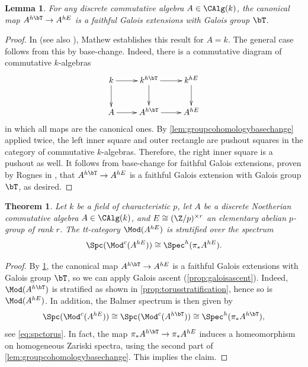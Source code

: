\documentclass{amsart}%
\numberwithin{equation}{section}%
\newtheorem{Thm}[subsection]{Theorem}
\newtheorem{Lem}[subsection]{Lemma}
\theoremstyle{remark}
\begin{document}
\begin{Lem}\label{lem:elabgaloisext}
For any discrete commutative algebra $A \in \CAlg(k)$, the canonical map $A^{h\bT} \to A^{hE}$ is a faithful Galois extensions with Galois group $\bT$.
\end{Lem}
\begin{proof}
In \cite[Prop.~3.9]{mathew_torus} (see also \cite[\S9]{mathew_galois}), Mathew establishes this result for $A = k$. The general case follows from this by base-change. Indeed, there is a commutative diagram of commutative $k$-algebras
\[
\xymatrix{k \ar[r] \ar[d] & k^{h\bT} \ar[r] \ar[d] & k^{hE} \ar[d] \\
A \ar[r] & A^{h\bT} \ar[r] & A^{hE}}
\]
in which all maps are the canonical ones. By \cref{lem:groupcohomologybasechange} applied twice, the left inner square and outer rectangle are pushout squares in the category of commutative $k$-algebras. Therefore, the right inner square is a pushout as well. It follows from base-change for faithful Galois extensions, proven by Rognes in \cite[Lem.~7.1.1]{Rognes08}, that $A^{h\bT} \to A^{hE}$ is a faithful Galois extension with Galois group $\bT$, as desired.
\end{proof}

\begin{Thm}\label{thm:elabstratificationmodp}
Let $k$ be a field of characteristic $p$, let $A$ be a discrete Noetherian commutative algebra $A \in \CAlg(k)$, and $E \cong (\Z/p)^{\times r}$ an elementary abelian $p$-group of rank $r$. The tt-category $\Mod(A^{hE})$ is stratified over the spectrum
\[
\Spc(\Mod^c(A^{hE})) \cong \Spec^h(\pi_*A^{hE}).
\]
\end{Thm}
\begin{proof}
By \cref{lem:elabgaloisext}, the canonical map $A^{h\bT} \to A^{hE}$ is a faithful Galois extensions with Galois group $\bT$, so we can apply Galois ascent  (\cref{prop:galoisascent}). Indeed, $\Mod(A^{h\bT})$ is stratified as shown in \cref{prop:torusstratification}, hence so is $\Mod(A^{hE})$. In addition, the Balmer spectrum is then given by
\[
\Spc(\Mod^c(A^{hE})) \cong \Spc(\Mod^c(A^{h\bT})) \cong \Spec^h(\pi_*A^{h\bT}),
\]
see \eqref{eq:spctorus}. In fact, the map $\pi_*A^{h\bT} \to \pi_*A^{hE}$ induces a homeomorphism on homogeneous Zariski spectra, using the second part of \cref{lem:groupcohomologybasechange}. This implies the claim. 
\end{proof}
\end{document}
